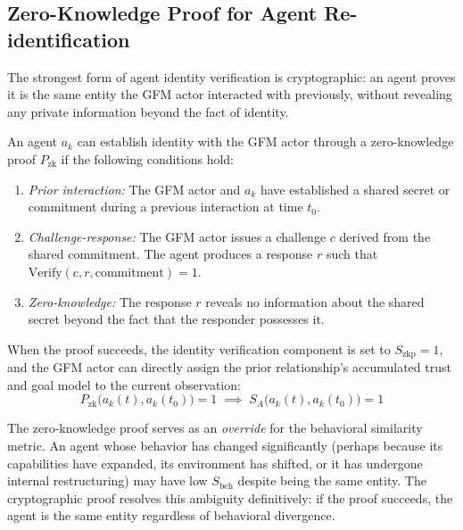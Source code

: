 
\subsection{Zero-Knowledge Proof for Agent Re-identification}
\label{app:zkp}

The strongest form of agent identity verification is cryptographic: an agent proves it is the same entity the GFM actor interacted with previously, without revealing any private information beyond the fact of identity.

\begin{definition}
\label{def:identity_proof}
An agent $a_k$ can establish identity with the GFM actor through a zero-knowledge proof $P_{\mathrm{zk}}$ if the following conditions hold:
\begin{enumerate}
\item \emph{Prior interaction:} The GFM actor and $a_k$ have established a shared secret or commitment during a previous interaction at time $t_0$.
\item \emph{Challenge-response:} The GFM actor issues a challenge $c$ derived from the shared commitment. The agent produces a response $r$ such that $\mathrm{Verify}(c, r, \mathrm{commitment}) = 1$.
\item \emph{Zero-knowledge:} The response $r$ reveals no information about the shared secret beyond the fact that the responder possesses it.
\end{enumerate}
When the proof succeeds, the identity verification component is set to $S_{\mathrm{zkp}} = 1$, and the GFM actor can directly assign the prior relationship's accumulated trust and goal model to the current observation:
\begin{equation}
\label{eq:zkp_identity}
P_{\mathrm{zk}}\bigl(a_k(t), a_k(t_0)\bigr) = 1 \;\implies\; S_A\bigl(a_k(t), a_k(t_0)\bigr) = 1
\end{equation}
\end{definition}

The zero-knowledge proof serves as an \emph{override} for the behavioral similarity metric. An agent whose behavior has changed significantly (perhaps because its capabilities have expanded, its environment has shifted, or it has undergone internal restructuring) may have low $S_{\mathrm{beh}}$ despite being the same entity. The cryptographic proof resolves this ambiguity definitively: if the proof succeeds, the agent is the same entity regardless of behavioral divergence.

